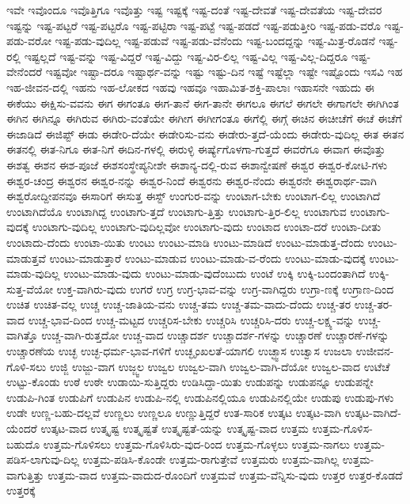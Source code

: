 {ಇವೇ
ಇವೊಂದೂ
ಇವೊತ್ತಿಗೂ
ಇವೊತ್ತು
ಇಷ್ಟ
ಇಷ್ಟಕ್ಕೆ
ಇಷ್ಟ-ದಂತೆ
ಇಷ್ಟ-ದೇವತೆ
ಇಷ್ಟ-ದೇವತೆಯ
ಇಷ್ಟ-ದೇವರ
ಇಷ್ಟನ್ನು
ಇಷ್ಟ-ಪಟ್ಟರೆ
ಇಷ್ಟ-ಪಟ್ಟರೊ
ಇಷ್ಟ-ಪಟ್ಟಿರಾ
ಇಷ್ಟ-ಪಟ್ಟೆ
ಇಷ್ಟ-ಪಡದೆ
ಇಷ್ಟ-ಪಡುತ್ತೀರಿ
ಇಷ್ಟ-ಪಡು-ವರೊ
ಇಷ್ಟ-ಪಡು-ವರೋ
ಇಷ್ಟ-ಪಡು-ವುದಿಲ್ಲ
ಇಷ್ಟ-ಪಡುವೆ
ಇಷ್ಟ-ಪಡು-ವೆನೆಂದು
ಇಷ್ಟ-ಬಂದದ್ದನ್ನು
ಇಷ್ಟ-ಮಿತ್ರ-ರೊಡನೆ
ಇಷ್ಟ-ರಲ್ಲಿ
ಇಷ್ಟಲ್ಲದೆ
ಇಷ್ಟ-ವನ್ನು
ಇಷ್ಟ-ವಿದ್ದರೆ
ಇಷ್ಟ-ವಿದ್ದು
ಇಷ್ಟ-ವಿರ-ಲಿಲ್ಲ
ಇಷ್ಟ-ವಿಲ್ಲ
ಇಷ್ಟ-ವಿಲ್ಲ-ದಿದ್ದರೂ
ಇಷ್ಟ-ವೇನೆಂದರೆ
ಇಷ್ಟವೋ
ಇಷ್ಟಾ-ದರೂ
ಇಷ್ಟಾರ್ಥ-ವನ್ನು
ಇಷ್ಟು
ಇಷ್ಟು-ದಿನ
ಇಷ್ಟೆ
ಇಷ್ಟೆಲ್ಲಾ
ಇಷ್ಟೇ
ಇಷ್ಟೊಂದು
ಇಸವಿ
ಇಹ
ಇಹ-ಜೀವನ-ದಲ್ಲಿ
ಇಹನು
ಇಹ-ಲೋಕದ
ಇಹವು
ಇಹವೂ
ಇಹಾಮಿತ-ಶಕ್ತಿ-ಪಾಲಾಃ
ಇಹಾಸನೇ
ಇಹುದು
ಈ
ಈಕೆಯು
ಈಕ್ಷಿಸು-ವವನು
ಈಗ
ಈಗಂತೂ
ಈಗ-ತಾನೆ
ಈಗ-ತಾನೇ
ಈಗಲೂ
ಈಗಲೆ
ಈಗಲೇ
ಈಗಾಗಲೇ
ಈಗಿಗಿಂತ
ಈಗಿನ
ಈಗಿನ್ನೂ
ಈಗಿರುವ
ಈಗಿರು-ವಂತೆಯೇ
ಈಗೀಗ
ಈಗೀಗಂತೂ
ಈಗೆಲ್ಲಿ
ಈಗ್ಗೆ
ಈಚಿನ
ಈಚೀಚೆಗೆ
ಈಚೆ
ಈಚೆಗೆ
ಈಜಾಡಿದೆ
ಈಜಿಪ್ಟ್
ಈಡು
ಈಡೇರಿ-ದೆಯೇ
ಈಡೇರಿಸು-ವನು
ಈಡೇರು-ತ್ತದೆ-ಯೆಂದು
ಈಡೇರು-ವುದಿಲ್ಲ
ಈತ
ಈತನ
ಈತನಲ್ಲಿ
ಈತ-ನಿಗೂ
ಈತ-ನಿಗೆ
ಈದಿನ-ಗಳಲ್ಲಿ
ಈರುಳ್ಳಿ
ಈರ್ಷ್ಯೆಗೊಳಗಾ-ಗುತ್ತದೆ
ಈವರೆಗೂ
ಈವಾಗ
ಈವೊತ್ತು
ಈಶತ್ವ
ಈಶನ
ಈಶ-ಪೂಜೆ
ಈಶಸಂಸ್ಥೇಪ್ಯನೀಶೇ
ಈಶಾನ್ಯ-ದಲ್ಲಿ-ರುವ
ಈಶಾನ್ವೇಷಣೆ
ಈಶ್ವರ
ಈಶ್ವರ-ಕೋಟಿ-ಗಳು
ಈಶ್ವರ-ಚಂದ್ರ
ಈಶ್ವರನ
ಈಶ್ವರ-ನನ್ನು
ಈಶ್ವರ-ನಿಂದೆ
ಈಶ್ವರನು
ಈಶ್ವರ-ನೆಂದು
ಈಶ್ವರನೇ
ಈಶ್ವರಾರ್ಥ-ವಾಗಿ
ಈಶ್ವರೋದ್ದೀಪನವೂ
ಈಸಾರಿಗೆ
ಈಸುತ್ತ
ಈಸ್ಟ್
ಉಂಗುರ-ವನ್ನು
ಉಂಟಾಗ-ಬೇಕು
ಉಂಟಾಗ-ಲಿಲ್ಲ
ಉಂಟಾಗಿದೆ
ಉಂಟಾಗಿದೆಯೊ
ಉಂಟಾಗಿದ್ದ
ಉಂಟಾಗು-ತ್ತದೆ
ಉಂಟಾಗು-ತ್ತಿತ್ತು
ಉಂಟಾಗು-ತ್ತಿರ-ಲಿಲ್ಲ
ಉಂಟಾಗುವ
ಉಂಟಾಗು-ವುದಕ್ಕೆ
ಉಂಟಾಗು-ವುದಿಲ್ಲ
ಉಂಟಾಗು-ವುದಿಲ್ಲವೋ
ಉಂಟಾಗು-ವುದು
ಉಂಟಾದ
ಉಂಟಾ-ದರೆ
ಉಂಟಾ-ದೀತು
ಉಂಟಾದು-ದೆಂದು
ಉಂಟಾ-ಯಿತು
ಉಂಟು
ಉಂಟು-ಮಾಡಿ
ಉಂಟು-ಮಾಡಿದೆ
ಉಂಟು-ಮಾಡುತ್ತ-ದೆಂದು
ಉಂಟು-ಮಾಡುತ್ತವೆ
ಉಂಟು-ಮಾಡುತ್ತಾರೆ
ಉಂಟು-ಮಾಡುವ
ಉಂಟು-ಮಾಡು-ವ-ರೆಂದು
ಉಂಟು-ಮಾಡು-ವುದಕ್ಕೆ
ಉಂಟು-ಮಾಡು-ವುದಿಲ್ಲ
ಉಂಟು-ಮಾಡು-ವುದು
ಉಂಟು-ಮಾಡು-ವುದೆಂಬುದು
ಉಂಟೆ
ಉಕ್ಕಿ
ಉಕ್ಕಿ-ಬಂದಂತಾಗಿದೆ
ಉಕ್ಕಿ-ಸುತ್ತ-ವೆಯೋ
ಉಕ್ತ-ವಾಗಿರು-ವುದು
ಉಗರೆ
ಉಗ್ರ
ಉಗ್ರ-ಭಾವ-ವನ್ನು
ಉಗ್ರ-ವಾಗಿದ್ದರು
ಉಗ್ರಾ-ಣಕ್ಕೆ
ಉಗ್ರಾಣ-ದಿಂದ
ಉಚಿತ
ಉಚಿತ-ವಲ್ಲ
ಉಚ್ಚ
ಉಚ್ಚ-ಜಾತಿಯ-ವನು
ಉಚ್ಚ-ತಮ
ಉಚ್ಚ-ತಮ-ವಾದು-ದೆಂದು
ಉಚ್ಚ-ತರ
ಉಚ್ಚ-ತರ-ವಾದ
ಉಚ್ಚ-ಭಾವ-ದಿಂದ
ಉಚ್ಚ-ಮಟ್ಟದ
ಉಚ್ಚರಿಸ-ಬೇಕು
ಉಚ್ಚರಿಸಿ
ಉಚ್ಚರಿಸಿ-ದರು
ಉಚ್ಚ-ಲಕ್ಷ್ಯ-ವನ್ನು
ಉಚ್ಚ-ವಾಗಿತ್ತೊ
ಉಚ್ಚ-ವಾಗಿ-ರುತ್ತದೋ
ಉಚ್ಚ-ವಾದ
ಉಚ್ಚಾದರ್ಶ
ಉಚ್ಚಾದರ್ಶ-ಗಳನ್ನು
ಉಚ್ಚಾರಣೆ
ಉಚ್ಚಾರಣೆ-ಗಳನ್ನು
ಉಚ್ಚಾರಣೆಯ
ಉಚ್ಛ
ಉಚ್ಛ-ಧರ್ಮ-ಭಾವ-ಗಳಿಗೆ
ಉಚ್ಛೃಂಖಲತೆ-ಯಾಗಲಿ
ಉಚ್ಛ್ವಾಸ
ಉಚ್ವಾಸ
ಉಜಲಾ
ಉಜೀವನ-ಗೊಳಿ-ಸಲು
ಉಜ್ಜಿ
ಉಜ್ಜು-ವಾಗ
ಉಜ್ಜ್ವಲ
ಉಜ್ವಲ
ಉಜ್ವಲ-ವಾಗಿ
ಉಜ್ವಲ-ವಾಗಿ-ದೆಯೋ
ಉಜ್ವಲ-ವಾದ
ಉಟೆಚೆ
ಉಟ್ಟು-ಕೊಂಡು
ಉಠೆ
ಉಠೇ
ಉಡಾಯಿ-ಸುತ್ತಿದ್ದರು
ಉಡಿಸಿದ್ದಾ-ಯಿತು
ಉಡುಪನ್ನು
ಉಡುಪನ್ನೂ
ಉಡುಪನ್ನೇ
ಉಡುಪಿ-ಗಿಂತ
ಉಡುಪಿಗೆ
ಉಡುಪಿನ
ಉಡುಪಿ-ನಲ್ಲಿ
ಉಡುಪಿನಲ್ಲಿಯೂ
ಉಡುಪಿನಲ್ಲಿಯೇ
ಉಡುಪು
ಉಡುಪು-ಗಳು
ಉಡೇ
ಉಣ್ಣ-ಬಹು-ದಲ್ಲವೆ
ಉಣ್ಣಲು
ಉಣ್ಣಲೂ
ಉಣ್ಣುತ್ತಿದ್ದರೆ
ಉತ-ಸಾರಿಕ
ಉತ್ಕಟ
ಉತ್ಕಟ-ವಾಗಿ
ಉತ್ಕಟ-ವಾಗಿದೆ-ಯೆಂದರೆ
ಉತ್ಕಟ-ವಾದ
ಉತ್ಕೃಷ್ಟ
ಉತ್ಕೃಷ್ಟತೆ
ಉತ್ಕೃಷ್ಟತೆ-ಯನ್ನು
ಉತ್ಕೃಷ್ಟ-ವಾದ
ಉತ್ತಮ
ಉತ್ತಮ-ಗೊಳಿಸ-ಬಹುದೊ
ಉತ್ತಮ-ಗೊಳಿಸಲು
ಉತ್ತಮ-ಗೊಳಿಸಿರು-ವುದ-ರಿಂದ
ಉತ್ತಮ-ಗೊಳ್ಳಲು
ಉತ್ತಮ-ನಾಗಲು
ಉತ್ತಮ-ಪಡಿಸ-ಲಾಗುವು-ದಿಲ್ಲ
ಉತ್ತಮ-ಪಡಿಸಿ-ಕೊಂಡೇ
ಉತ್ತಮ-ರಾಗುತ್ತೇವೆ
ಉತ್ತಮರು
ಉತ್ತಮ-ವಾಗಿಲ್ಲ
ಉತ್ತಮ-ವಾಗುತ್ತಿತ್ತು
ಉತ್ತಮ-ವಾದ
ಉತ್ತಮ-ವಾದುದ-ರೊಂದಿಗೆ
ಉತ್ತಮವೆ
ಉತ್ತಮ-ವೆನ್ನಿಸು-ವುದು
ಉತ್ತರ
ಉತ್ತರ-ಕೊಡದೆ
ಉತ್ತರಕ್ಕೆ
}
